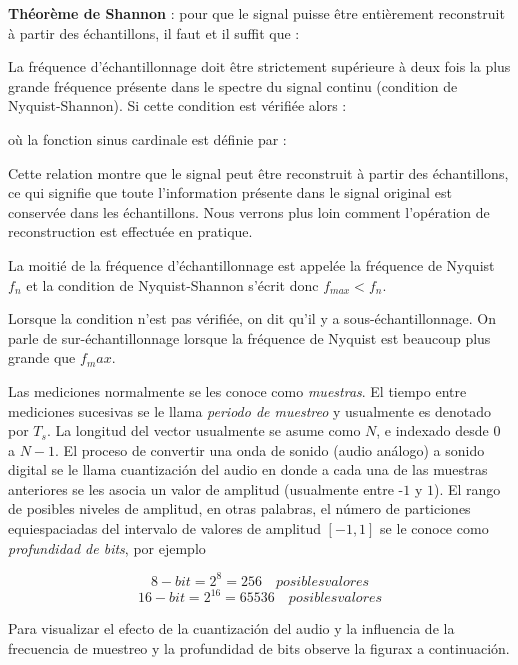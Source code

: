 \documentclass[conference,onecolumn]{IEEEtran}
\begin{document}
\textbf{Théorème de Shannon} : pour que le signal puisse être entièrement reconstruit à partir des échantillons, il faut et il suffit que : 

La fréquence d'échantillonnage doit être strictement supérieure à deux fois la plus grande fréquence présente dans le spectre du signal continu (condition de Nyquist-Shannon). Si cette condition est vérifiée alors : 

où la fonction sinus cardinale est définie par : 

Cette relation montre que le signal peut être reconstruit à partir des échantillons, ce qui signifie que toute l'information présente dans le signal original est conservée dans les échantillons. Nous verrons plus loin comment l'opération de reconstruction est effectuée en pratique. 

La moitié de la fréquence d'échantillonnage est appelée la fréquence de Nyquist $f_n$ et la condition de Nyquist-Shannon s'écrit donc $f_{max}<f_n$. 

Lorsque la condition n'est pas vérifiée, on dit qu'il y a sous-échantillonnage. On parle de sur-échantillonnage lorsque la fréquence de Nyquist est beaucoup plus grande que $f_max$. 

Las mediciones normalmente se les conoce como \textit{muestras}. El tiempo entre mediciones sucesivas se le llama \textit{periodo de muestreo} y usualmente es denotado por $T_s$. La longitud del vector usualmente se asume como $N$, e indexado desde $0$ a $N-1$. El proceso de convertir una onda de sonido (audio análogo) a sonido digital se le llama cuantización del audio en donde a cada una de las muestras anteriores se les asocia un valor de amplitud (usualmente entre -$1$ y $1$). El rango de posibles niveles de amplitud, en otras palabras, el número de particiones equiespaciadas del intervalo de valores de amplitud $[-1,1]$ se le conoce como \textit{profundidad de bits}, por ejemplo 

\[8-bit = 2^8 = 256 \quad posibles valores\]
\[16-bit = 2^{16} = 65536 \quad posibles valores\]

Para visualizar el efecto de la cuantización del audio y la influencia de la frecuencia de muestreo y la profundidad de bits observe la figurax a continuación.
\end{document}
